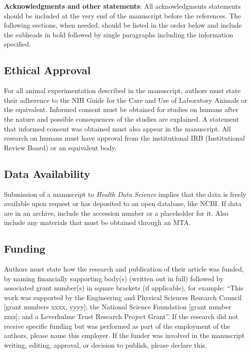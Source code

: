\documentclass{article}
\begin{document}
\begin{flushleft}
\textbf{Acknowledgments and other statements}: All acknowledgments statements should be included at the very end of the manuscript before the references. The following sections, when needed, should be listed in the order below and include the subheads in bold followed by single paragraphs including the information specified. 
\end{flushleft}

\subsection*{Ethical Approval} 
For all animal experimentation described in the manuscript, authors must state their adherence to the NIH Guide for the Care and Use of Laboratory Animals or the equivalent. Informed consent must be obtained for studies on humans after the nature and possible consequences of the studies are explained. A statement that informed consent was obtained must also appear in the manuscript. All research on humans must have approval from the institutional IRB (Institutional Review Board) or an equivalent body. 

\subsection*{Data Availability}
Submission of a manuscript to \textit{Health Data Science} implies that the data is freely available upon request or has deposited to an open database, like NCBI. If data are in an archive, include the accession number or a placeholder for it. Also include any materials that must be obtained through an MTA.  

\subsection*{Funding}
Authors must state how the research and publication of their article was funded, by naming financially supporting body(s) (written out in full) followed by associated grant number(s) in square brackets (if applicable), for example: “This work was supported by the Engineering and Physical Sciences Research Council [grant numbers xxxx, yyyy]; the National Science Foundation [grant number zzzz]; and a Leverhulme Trust Research Project Grant”. If the research did not receive specific funding but was performed as part of the employment of the authors, please name this employer. If the funder was involved in the manuscript writing, editing, approval, or decision to publish, please declare this.
\end{document}
